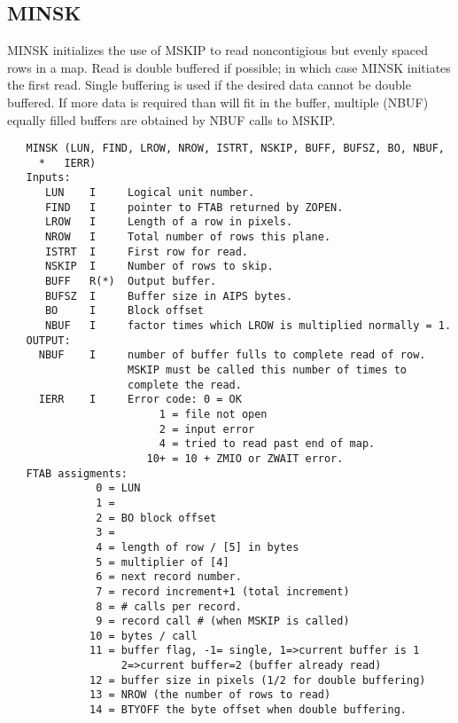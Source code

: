 \subsection{MINSK}
MINSK initializes the use of MSKIP to read noncontigious but evenly
spaced rows in a map.  Read is double buffered if possible; in which
case MINSK initiates the first read.  Single buffering is used if
the desired data cannot be double buffered.  If more data is
required than will fit in the buffer, multiple (NBUF) equally filled
buffers are obtained by NBUF calls to MSKIP.
\begin{verbatim}
   MINSK (LUN, FIND, LROW, NROW, ISTRT, NSKIP, BUFF, BUFSZ, BO, NBUF,
     *   IERR)
   Inputs:
      LUN    I     Logical unit number.
      FIND   I     pointer to FTAB returned by ZOPEN.
      LROW   I     Length of a row in pixels.
      NROW   I     Total number of rows this plane.
      ISTRT  I     First row for read.
      NSKIP  I     Number of rows to skip.
      BUFF   R(*)  Output buffer.
      BUFSZ  I     Buffer size in AIPS bytes.
      BO     I     Block offset
      NBUF   I     factor times which LROW is multiplied normally = 1.
   OUTPUT:
     NBUF    I     number of buffer fulls to complete read of row.
                   MSKIP must be called this number of times to
                   complete the read.
     IERR    I     Error code: 0 = OK
                        1 = file not open
                        2 = input error
                        4 = tried to read past end of map.
                      10+ = 10 + ZMIO or ZWAIT error.
   FTAB assigments:
              0 = LUN
              1 =
              2 = BO block offset
              3 =
              4 = length of row / [5] in bytes
              5 = multiplier of [4]
              6 = next record number.
              7 = record increment+1 (total increment)
              8 = # calls per record.
              9 = record call # (when MSKIP is called)
             10 = bytes / call
             11 = buffer flag, -1= single, 1=>current buffer is 1
                  2=>current buffer=2 (buffer already read)
             12 = buffer size in pixels (1/2 for double buffering)
             13 = NROW (the number of rows to read)
             14 = BTYOFF the byte offset when double buffering.
\end{verbatim}

